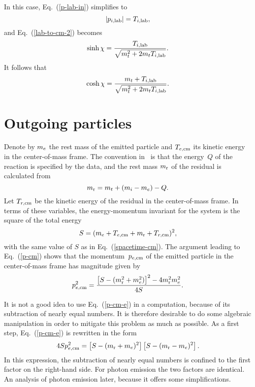 {In this case, Eq.~(\ref{p-lab-in}) simplifies to
$$
  | p_{i,\textrm{lab}} |  =  T_{i,\textrm{lab}},
$$
and Eq.~(\ref{lab-to-cm-2}) becomes
$$
  \sinh \chi = \frac{ T_{i,\textrm{lab}}}
    {\sqrt{ m_t^2 + 2 m_t T_{i,\textrm{lab}} }}.
$$
It follows that
$$
  \cosh \chi = \frac{ m_t + T_{i,\textrm{lab}}}
    {\sqrt{ m_t^2 + 2 m_t T_{i,\textrm{lab}} }}.
$$



\section{Outgoing particles}
Denote by $m_e$ the rest mass of the
emitted particle and
$T_{e,\textrm{cm}}$ its kinetic energy in the center-of-mass frame.
The convention in \xendl\ is that the energy~$Q$ of the reaction
is specified by the data, and the rest mass  $m_{\text{r}}$ of the residual
is calculated from
\begin{equation}
  m_{\text{r}} = m_t + ( m_i - m_e ) - Q.
 \label{Q-2body}
\end{equation}
Let $T_{r,\textrm{cm}}$ be the kinetic energy of the residual in the center-of-mass frame.
In terms of these variables, the energy-momentum invariant
for the system is the square of the total energy
$$
    S = (m_e + T_{e,\textrm{cm}} + m_{\text{r}} + T_{r,\textrm{cm}})^2,
$$
with the same value of $S$ as in Eq.~(\ref{spacetime-cm}).
The argument leading to Eq.~(\ref{p-cm}) shows that the
momentum~$p_{e,\textrm{cm}}$ of the emitted particle in the center-of-mass frame
has magnitude given by
\begin{equation}
  p_{e,\textrm{cm}}^2 = \frac{ \left[S - (m_{\text{r}}^2 + m_e^2)\right]^2 -
                 4 m_{\text{r}}^2 m_e^2 }
                {4 S }.
  \label{p-cm-e}
\end{equation}

It is not a good idea to use Eq.~(\ref{p-cm-e}) in a
computation, because of its subtraction of nearly equal
numbers.  It is therefore desirable to do some algebraic manipulation
in order to mitigate this problem as much as possible.
As a first step, Eq.~(\ref{p-cm-e}) is rewritten in the
form
\begin{equation}
  4 S p_{e,\textrm{cm}}^2 = \left[S - (m_{\text{r}} + m_e)^2\right]
              \left[S - (m_{\text{r}} - m_e)^2\right].
 \label{p-cm-e-1}
\end{equation}
In this expression, the subtraction of nearly equal
numbers is confined to the first factor on the right-hand
side.  For photon emission the two factors are identical.
An analysis of photon emission later, because it offers some
simplifications.

}

